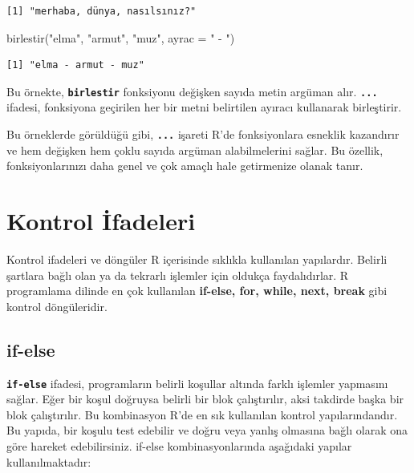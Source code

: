 \documentclass[
  letterpaper,
  DIV=11,
  numbers=noendperiod]{scrreprt}
\newenvironment{Shaded}{\begin{snugshade}}{\end{snugshade}}
\newcommand{\AttributeTok}[1]{\textcolor[rgb]{0.40,0.45,0.13}{#1}}
\newcommand{\FunctionTok}[1]{\textcolor[rgb]{0.28,0.35,0.67}{#1}}
\newcommand{\NormalTok}[1]{\textcolor[rgb]{0.00,0.23,0.31}{#1}}
\newcommand{\StringTok}[1]{\textcolor[rgb]{0.13,0.47,0.30}{#1}}
\begin{document}
\begin{verbatim}
[1] "merhaba, dünya, nasılsınız?"
\end{verbatim}

\begin{Shaded}
\begin{Highlighting}[]
\FunctionTok{birlestir}\NormalTok{(}\StringTok{"elma"}\NormalTok{, }\StringTok{"armut"}\NormalTok{, }\StringTok{"muz"}\NormalTok{, }\AttributeTok{ayrac =} \StringTok{" {-} "}\NormalTok{)}
\end{Highlighting}
\end{Shaded}

\begin{verbatim}
[1] "elma - armut - muz"
\end{verbatim}

Bu örnekte, \textbf{\texttt{birlestir}} fonksiyonu değişken sayıda metin
argüman alır. \textbf{\texttt{...}} ifadesi, fonksiyona geçirilen her
bir metni belirtilen ayıracı kullanarak birleştirir.

Bu örneklerde görüldüğü gibi, \textbf{\texttt{...}} işareti R'de
fonksiyonlara esneklik kazandırır ve hem değişken hem çoklu sayıda
argüman alabilmelerini sağlar. Bu özellik, fonksiyonlarınızı daha genel
ve çok amaçlı hale getirmenize olanak tanır.

\chapter{Kontrol İfadeleri}\label{kontrol-ifadeleri}

Kontrol ifadeleri ve döngüler R içerisinde sıklıkla kullanılan
yapılardır. Belirli şartlara bağlı olan ya da tekrarlı işlemler için
oldukça faydalıdırlar. R programlama dilinde en çok kullanılan
\textbf{if-else, for, while, next, break} gibi kontrol döngüleridir.

\section{if-else}\label{if-else}

\textbf{\texttt{if-else}} ifadesi, programların belirli koşullar altında
farklı işlemler yapmasını sağlar. Eğer bir koşul doğruysa belirli bir
blok çalıştırılır, aksi takdirde başka bir blok çalıştırılır. Bu
kombinasyon R'de en sık kullanılan kontrol yapılarındandır. Bu yapıda,
bir koşulu test edebilir ve doğru veya yanlış olmasına bağlı olarak ona
göre hareket edebilirsiniz. if-else kombinasyonlarında aşağıdaki yapılar
kullanılmaktadır:
\end{document}
